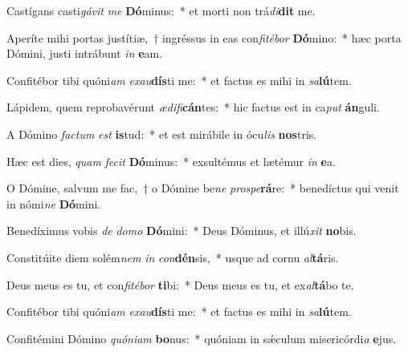 \item Castígans casti\textit{gá}\textit{vit} \textit{me} \textbf{Dó}minus:~* et morti non trá\textit{di}\textbf{dit} me.
\item Aperíte mihi portas justítiæ,~† ingréssus in eas con\textit{fi}\textit{té}\textit{bor} \textbf{Dó}mino:~* hæc porta Dómini, justi intrábunt \textit{in} \textbf{e}am.
\item Confitébor tibi quóni\textit{am} \textit{ex}\textit{au}\textbf{dís}ti me:~* et factus es mihi in \textit{sa}\textbf{lú}tem.
\item Lápidem, quem reprobavérunt \textit{æ}\textit{di}\textit{fi}\textbf{cán}tes:~* hic factus est in ca\textit{put} \textbf{án}guli.
\item A Dómino \textit{fac}\textit{tum} \textit{est} \textbf{is}tud:~* et est mirábile in ócu\textit{lis} \textbf{nos}tris.
\item Hæc est dies, \textit{quam} \textit{fe}\textit{cit} \textbf{Dó}minus:~* exsultémus et lætémur \textit{in} \textbf{e}a.
\item O Dómine, salvum me fac,~† o Dómine be\textit{ne} \textit{pro}\textit{spe}\textbf{rá}re:~* benedíctus qui venit in nómi\textit{ne} \textbf{Dó}mini.
\item Benedíximus vobis \textit{de} \textit{do}\textit{mo} \textbf{Dó}mini:~* Deus Dóminus, et illú\textit{xit} \textbf{no}bis.
\item Constitúite diem solém\textit{nem} \textit{in} \textit{con}\textbf{dén}sis,~* usque ad cornu \textit{al}\textbf{tá}ris.
\item Deus meus es tu, et con\textit{fi}\textit{té}\textit{bor} \textbf{ti}bi:~* Deus meus es tu, et ex\textit{al}\textbf{tá}bo te.
\item Confitébor tibi quóni\textit{am} \textit{ex}\textit{au}\textbf{dís}ti me:~* et factus es mihi in \textit{sa}\textbf{lú}tem.
\item Confitémini Dómino \textit{quón}\textit{i}\textit{am} \textbf{bo}nus:~* quóniam in sǽculum misericórdi\textit{a} \textbf{e}jus.
